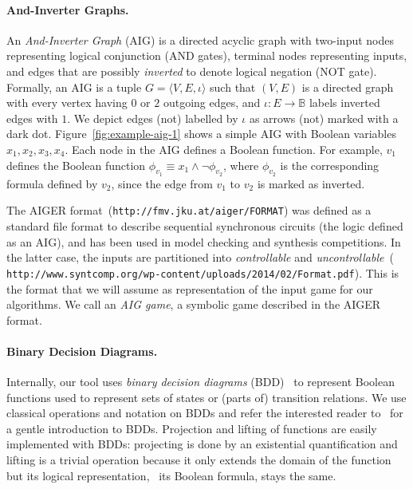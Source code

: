 \documentclass[submission,copyright,creativecommons]{eptcs}
\begin{document}
\paragraph{And-Inverter Graphs.}
An \emph{And-Inverter Graph} (AIG) is a directed acyclic graph with two-input
nodes representing logical conjunction (AND gates), terminal nodes representing
inputs, and edges that are possibly \emph{inverted} to denote logical negation
(NOT gate). Formally, an AIG is a tuple $G = \langle V,E,\iota \rangle$ such that
$(V,E)$ is a directed graph with every vertex having $0$ or $2$ outgoing edges,
and $\iota : E \to \mathbb{B}$ labels inverted edges with $1$. We depict edges
(not) labelled by $\iota$ as arrows (not) marked with a dark dot.
Figure~\ref{fig:example-aig-1} shows a simple AIG with Boolean variables
$x_1,x_2,x_3,x_4$. Each node in the AIG defines a Boolean function. For example,
$v_1$ defines the Boolean function
$\phi_{v_1} \equiv x_1 \land \lnot \phi_{v_2}$, where
$\phi_{v_2}$ is the corresponding formula defined by $v_2$, since the edge from
$v_1$ to $v_2$ is marked as inverted.

The AIGER format~({\tt http://fmv.jku.at/aiger/FORMAT}) was defined as a standard
file format to describe sequential synchronous circuits (the logic defined as an
AIG), and has been used in model checking and synthesis competitions. In the
latter case, the inputs are partitioned into \emph{controllable} and
\emph{uncontrollable}~({\tt
http://www.syntcomp.org/wp-content/uploads/2014/02/Format.pdf}). This is the
format that we will assume as representation of the input game for our
algorithms.  We call an \emph{AIG game}, a symbolic game described in the AIGER
format.

\paragraph{Binary Decision Diagrams.}
Internally, our tool uses \emph{binary decision diagrams} (BDD)~\cite{bryant86}
to represent Boolean functions used to represent sets of states or (parts of)
transition relations.
We use classical operations and notation on BDDs and refer the interested reader
to~\cite{Andersen97anintroduction} for a gentle introduction to BDDs\@. 
Projection and lifting of functions are easily implemented with BDDs:
projecting is done by an existential quantification and lifting is a trivial
operation because it only extends the domain of the function but its logical
representation, \ie\ its Boolean formula, stays the same.
\end{document}
